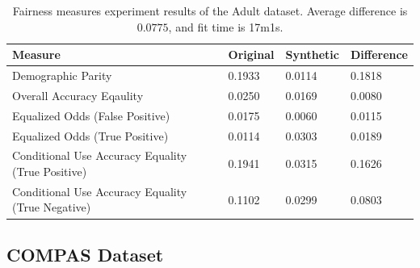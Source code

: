 \documentclass[manuscript,screen,review,anonymous]{acmart}
\begin{document}
\begin{table}[h]
\caption{
    Fairness measures experiment results of the Adult dataset.
    Average difference is $0.0775$, and fit time is 17m1s.
}

\label{tab:adult_score}
\begin{tabular}{llll}
\toprule
\textbf{Measure} & \textbf{Original} & \textbf{Synthetic} & \textbf{Difference} \\
\midrule
Demographic Parity  & 0.1933 & 0.0114 & 0.1818 \\
Overall Accuracy Eqaulity   & 0.0250 & 0.0169 & 0.0080 \\
Equalized Odds (False Positive)    & 0.0175 & 0.0060 & 0.0115 \\
Equalized Odds (True Positive)    & 0.0114 & 0.0303 & 0.0189 \\
Conditional Use Accuracy Equality (True Positive) & 0.1941 & 0.0315 & 0.1626 \\
Conditional Use Accuracy Equality (True Negative) & 0.1102 & 0.0299 & 0.0803 \\
\bottomrule
\end{tabular}
\end{table}

\subsection{COMPAS Dataset}
\end{document}

